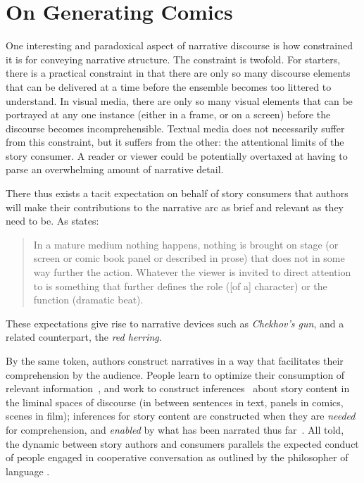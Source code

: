 \section{On Generating Comics}

One interesting and paradoxical aspect of narrative discourse is how constrained
it is for conveying narrative structure. The constraint is twofold. For
starters, there is a practical constraint in that there are only so many
discourse elements that can be delivered at a time before the ensemble becomes
too littered to understand. In visual media, there are only so many visual
elements that can be portrayed at any one instance (either in a frame, or on a
screen) before the discourse becomes incomprehensible. Textual media does not
necessarily suffer from this constraint, but it suffers from the other: the
attentional limits of the story consumer. A reader or viewer could be
potentially overtaxed at having to parse an overwhelming amount of narrative
detail.

There thus exists a tacit expectation on behalf of story consumers that authors
will make their contributions to the narrative arc as brief and relevant as they
need to be. As  states:
%
\begin{quote} 
	In a mature medium nothing happens, nothing is brought on stage (or screen 
	or comic book panel or described in prose) that does not in some way further 
	the action. Whatever the viewer is invited to direct attention to is
	something that further defines the role ([of a] character) or the function 
	(dramatic beat). 
	\end{quote}
%
These expectations give rise to narrative devices such as \emph{Chekhov's gun},
and a related counterpart, the \emph{red herring}.

By the same token, authors construct narratives in a way that facilitates their
comprehension by the audience. People learn to optimize their consumption of
relevant information~\cite{pirolli2007information}, and work to construct
inferences~\cite{magliano2016filling} about story content in the liminal spaces
of discourse (in between sentences in text, panels in comics, scenes in film);
inferences for story content are constructed when they are \emph{needed} for
comprehension, and \emph{enabled} by what has been narrated thus
far~\cite{myers1987degree}. All told, the dynamic between story authors and
consumers parallels the expected conduct of people engaged in cooperative
conversation as outlined by the philosopher of language .

